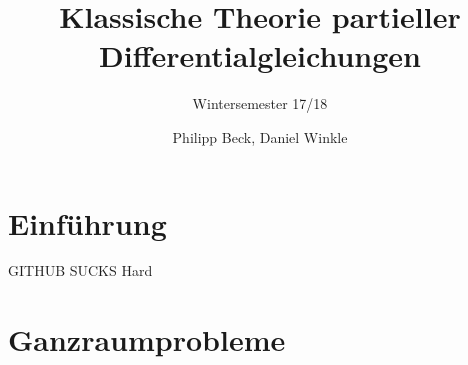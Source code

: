 \documentclass[12pt,a4paper]{scrreprt}
\author{Philipp Beck, Daniel Winkle}
\subtitle{Wintersemester 17/18}
\title{Klassische Theorie partieller Differentialgleichungen}
\numberwithin{equation}{section}
\newcommand{\changefont}[3]{\fontfamily{#1} \fontseries{#2} \fontshape{#3} \selectfont}
\theoremstyle{satz}
\theoremstyle{def}
\theoremstyle{exercise}
\begin{document}
\maketitle
\chapter{Einführung}
GITHUB SUCKS Hard

\chapter{Ganzraumprobleme}

\end{document}
